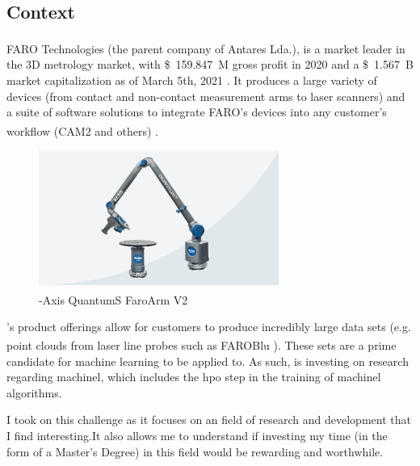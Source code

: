 
\subsection{Context}

FARO Technologies\textsuperscript{\textregistered} (the parent company of Antares Lda.), is a market leader in the 3D metrology market, with \SI{159.847}[\$]{M} gross profit in 2020 \parencite{faro_2021_financial_results} and a \SI{1.567}[\$]{B} market capitalization as of March 5th, 2021 \parencite{faro_stock_info}. It produces a large variety of devices (from contact and non-contact measurement arms to laser scanners) and a suite of software solutions to integrate FARO's devices into any customer's workflow (CAM2\textsuperscript{\textregistered} and others) \parencite{faro_homepage}.

\begin{figure}[h]
\centering
\includegraphics[width=0.7\textwidth]{images/faro_quantum_s_arm.png}
\caption{-Axis QuantumS FaroArm\textsuperscript{\textregistered} V2}
\end{figure}
 
\faro's product offerings allow for customers to produce incredibly large data sets (e.g. point clouds from laser line probes such as FAROBlu\textsuperscript{\textregistered} \parencite{faro_quantums}). These sets are a prime candidate for machine learning to be applied to. As such, \faro is investing on research regarding \acrlong{machinel}, which includes the \acrfull{hpo} step in the training of \acrshort{machinel} algorithms.

I took on this challenge as it focuses on an field of research and development that I find interesting.It also allows me to understand if investing my time (in the form of a Master's Degree) in this field would be rewarding and worthwhile.